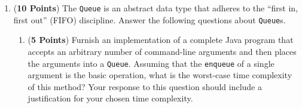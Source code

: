 \documentclass[12pt]{article}
\begin{document}
\begin{enumerate}
  
\item ({\bf 10 Points}) The {\tt Queue} is an abstract data type that
  adheres to the ``first in, first out'' (FIFO) discipline.  Answer
  the following questions about {\tt Queue}s.

  \begin{enumerate}
    




    \item ({\bf 5 Points}) Furnish an implementation of a complete
      Java program that accepts an arbitrary number of command-line
      arguments and then places the arguments into a {\tt Queue}.
      Assuming that the {\tt enqueue} of a single argument is the
      basic operation, what is the worst-case time complexity of this
      method?  Your response to this question should include a
      justification for your chosen time complexity.


\end{enumerate}
\end{enumerate}
\end{document}
